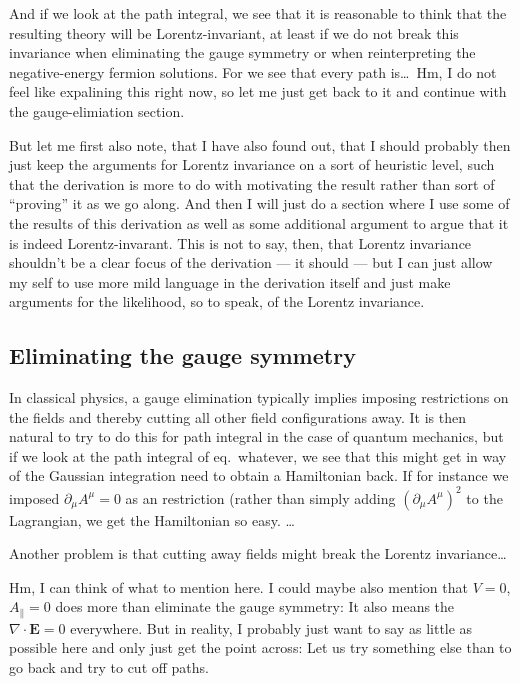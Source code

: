 \documentclass{report}
\begin{document}
And if we look at the path integral, we see that it is reasonable to think that the resulting theory will be Lorentz-invariant, at least if we do not break this invariance when eliminating the gauge symmetry or when reinterpreting the negative-energy fermion solutions. For we see that every path is\ldots\ Hm, I do not feel like expalining this right now, so let me just get back to it and continue with the gauge-elimiation section. 

But let me first also note, that I have also found out, that I should probably then just keep the arguments for Lorentz invariance on a sort of heuristic level, such that the derivation is more to do with motivating the result rather than sort of ``proving'' it as we go along. And then I will just do a section where I use some of the results of this derivation as well as some additional argument to argue that it is indeed Lorentz-invarant. This is not to say, then, that Lorentz invariance shouldn't be a clear focus of the derivation --- it should --- but I can just allow my self to use more mild language in the derivation itself and just make arguments for the likelihood, so to speak, of the Lorentz invariance. 

\subsection{Eliminating the gauge symmetry}
In classical physics, a gauge elimination typically implies imposing restrictions on the fields and thereby cutting all other field configurations away. It is then natural to try to do this for path integral in the case of quantum mechanics, but if we look at the path integral of eq.\ whatever, we see that this might get in way of the Gaussian integration need to obtain a Hamiltonian back. If for instance we imposed $\partial_\mu A^\mu = 0$ as an restriction (rather than simply adding $(\partial_\mu A^\mu)^2$ to the Lagrangian, we get the Hamiltonian so easy. \ldots

Another problem is that cutting away fields might break the Lorentz invariance\ldots 

Hm, I can think of what to mention here. I could maybe also mention that $V=0$, $A_\parallel=0$ does more than eliminate the gauge symmetry: It also means the $\nabla \cdot \boldsymbol{E} = 0$ everywhere. But in reality, I probably just want to say as little as possible here and only just get the point across: Let us try something else than to go back and try to cut off paths. 
\end{document}
